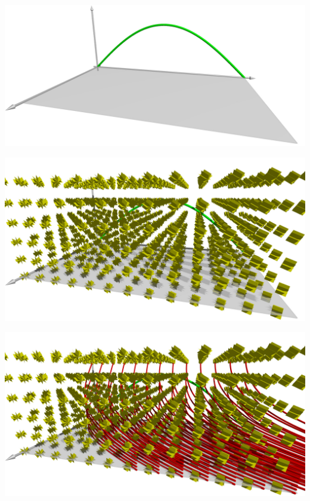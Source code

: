 \documentclass{beamer}
\begin{document}
\begin{frame}
\begin{center}
\includegraphics[width=\hsize]{../../skript/3d/cauchy.jpg}
\end{center}
\end{frame}

\begin{frame}
\begin{center}
\includegraphics[width=\hsize]{../../skript/3d/planes.jpg}
\end{center}
\end{frame}

\begin{frame}
\begin{center}
\includegraphics[width=\hsize]{../../skript/3d/chrpl.jpg}
\end{center}
\end{frame}
\end{document}

